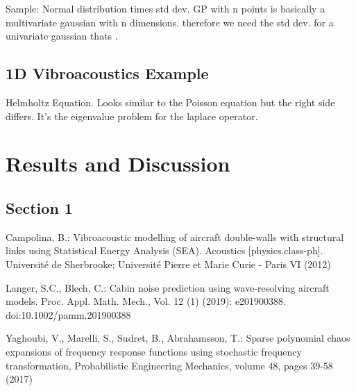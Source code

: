 \documentclass[%
  a4paper,oneside,%
  11pt,%
  smallchapters,
  green,%
  rgb, <cmyk>
  ,]{tubsbook}
\begin{document}
Sample: Normal distribution times std dev. GP with n points is basically a multivariate gaussian with n dimensions. therefore we need the std dev. for a univariate gaussian thats . 



\section{1D Vibroacoustics Example}
Helmholtz Equation. Looks similar to the Poisson equation but the right side differs. It's the eigenvalue problem for the laplace operator.

\lipsum[2-5] %



\chapter{Results and Discussion}

\lipsum[1-3] %

\section{Section 1}

\lipsum[4-7] %


\begin{thebibliography}{4}
%
Campolina, B.: Vibroacoustic modelling of aircraft double-walls with structural links using Statistical
Energy Analysis (SEA). Acoustics [physics.class-ph]. Université de Sherbrooke; Université Pierre
et Marie Curie - Paris VI (2012)

Langer, S.C., Blech, C.: Cabin noise prediction using wave‐resolving aircraft models. Proc. Appl. Math. Mech., Vol. 12 (1) (2019): e201900388. doi:10.1002/pamm.201900388

 Yaghoubi, V., Marelli, S., Sudret, B., Abrahamsson, T.: Sparse polynomial chaos expansions of frequency response functions using stochastic frequency transformation, Probabilistic Engineering Mechanics, volume 48, pages 39-58 (2017)
\end{thebibliography}
\end{document}
